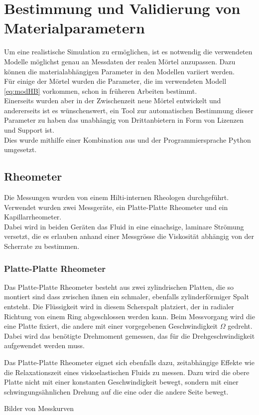 \section{Bestimmung und Validierung von Materialparametern}
\label{Kapitel:Parameter}
Um eine realistische Simulation zu ermöglichen, ist es notwendig die verwendeten Modelle möglichst genau an Messdaten der realen Mörtel anzupassen. Dazu können die materialabhängigen Parameter in den Modellen variiert werden.\\
Für einige der Mörtel wurden die Parameter, die im verwendeten Modell \eqref{eq:modHB} vorkommen, schon in früheren Arbeiten bestimmt. \\
Einerseits wurden aber in der Zwischenzeit neue Mörtel entwickelt und andererseits ist es wünschenswert, ein Tool zur automatischen Bestimmung dieser Parameter zu haben das unabhängig von Drittanbietern in Form von Lizenzen und Support ist. \\
Dies wurde mithilfe einer Kombination aus \openfoam{} und der Programmiersprache Python umgesetzt.
%
\subsection{Rheometer}
Die Messungen wurden von einem Hilti-internen Rheologen durchgeführt. Verwendet wurden zwei Messgeräte, ein Platte-Platte Rheometer und ein Kapillarrheometer.\\
Dabei wird in beiden Geräten das Fluid in eine einachsige, laminare Strömung versetzt, die es erlauben anhand einer Messgrösse die Viskosität abhängig von der Scherrate zu bestimmen.
%
\subsubsection{Platte-Platte Rheometer}
\label{Kapitel:Parameter:PlattePlatteRheo}
Das Platte-Platte Rheometer besteht aus zwei zylindrischen Platten, die so montiert sind dass zwischen ihnen ein schmaler, ebenfalls zylinderförmiger Spalt entsteht. 
Die Flüssigkeit wird in diesem Scherspalt platziert, der in radialer Richtung von einem Ring abgeschlossen werden kann. Beim Messvorgang wird die eine Platte fixiert, die andere mit einer vorgegebenen Geschwindigkeit $\Omega$ gedreht.
Dabei wird das benötigte Drehmoment gemessen, das für die Drehgeschwindigkeit aufgewendet werden muss.

Das Platte-Platte Rheometer eignet sich ebenfalls dazu, zeitabhängige Effekte wie die Relaxationszeit eines viskoelastischen Fluids zu messen. 
Dazu wird die obere Platte nicht mit einer konstanten Geschwindigkeit bewegt, sondern mit einer schwingungsähnlichen Drehung auf die eine oder die andere Seite bewegt.
%
\begin{todocontent}
    \1 Bilder von Messkurven
\end{todocontent}
%
